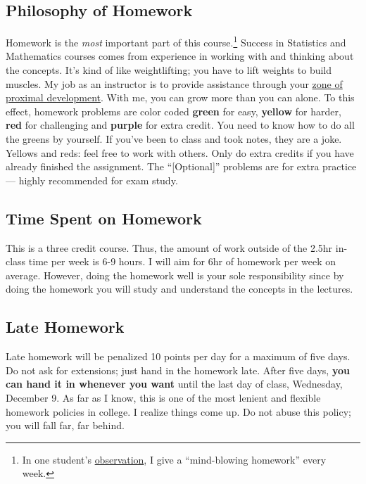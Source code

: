 \documentclass[12pt]{article}
\newcommand{\ingreen}[1]{\color{green}\textbf{#1} \color{black}}
\newcommand{\inyellow}[1]{\color{yellow}\textbf{#1} \color{black}}
\newcommand{\inred}[1]{\color{red}\textbf{#1} \color{black}}
\newcommand{\inpurple}[1]{\color{purple}\textbf{#1} \color{black}}
\newcommand{\qu}[1]{``#1''}
\begin{document}
\subsection*{Philosophy of Homework}


Homework is the \textit{most} important part of this course.\footnote{In one student's \href{http://www.ratemyprofessors.com/ShowRatings.jsp?tid=1951051}{observation}, I give a \qu{mind-blowing homework} every week.} Success in Statistics and Mathematics courses comes from experience in working with and thinking about the concepts. It's kind of like weightlifting; you have to lift weights to build muscles. My job as an instructor is to provide assistance through your \href{http://en.wikipedia.org/wiki/Zone_of_proximal_development}{zone of proximal development}. With me, you can grow more than you can alone. To this effect, homework problems are color coded \ingreen{green} for easy, \inyellow{yellow} for harder, \inred{red} for challenging and \inpurple{purple} for extra credit. You need to know how to do all the greens by yourself. If you've been to class and took notes, they are a joke. Yellows and reds: feel free to work with others. Only do extra credits if you have already finished the assignment. The \qu{[Optional]} problems are for extra practice --- highly recommended for exam study.

\subsection*{Time Spent on Homework }

This is a three credit course. Thus, the amount of work outside of the 2.5hr in-class time per week is 6-9 hours. I will aim for 6hr of homework per week on average. However, doing the homework well is your sole responsibility since by doing the homework you will study and understand the concepts in the lectures.

\subsection*{Late Homework}

Late homework will be penalized 10 points per day for a maximum of five days. Do not ask for extensions; just hand in the homework late. After five days, \textbf{you can hand it in whenever you want} until the last day of class, Wednesday, December 9. As far as I know, this is one of the most lenient and flexible homework policies in college. I realize things come up. Do not abuse this policy; you will fall far, far behind.
\end{document}
